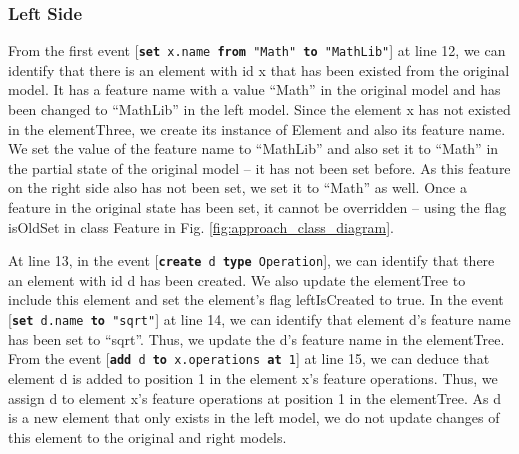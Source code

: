 \documentclass{jot}
\begin{document}
\subsubsection{Left Side}\label{sec:left_side}

From the first event [\texttt{\small \textbf{set} x.name \textbf{from} "Math" \textbf{to} "MathLib"}] at line 12, we can identify that there is an element with id \textsf{x} that has been existed from the original model. It has a feature \textsf{name} with a value ``Math'' in the original model and has been changed to ``MathLib'' in the left model. Since the element \textsf{x} has not existed in the \textsf{elementThree}, we create its instance of \textsf{Element} and also its feature \textsf{name}. We set the value of the feature \textsf{name} to ``MathLib'' and also set it to ``Math'' in the partial state of the original model -- it has not been set before. As this feature on the right side also has not been set, we set it to ``Math'' as well. Once a feature in the original state has been set, it cannot be overridden -- using the flag \textsf{isOldSet} in class \textsf{Feature} in Fig. \ref{fig:approach_class_diagram}. 

At line 13, in the event [\texttt{\small \textbf{create} d \textbf{type} Operation}], we can identify that there an element with id \textsf{d} has been created. We also update the \textsf{elementTree} to include this element and set the element's flag \textsf{leftIsCreated} to \textsf{true}. In the event [\texttt{\small \textbf{set} d.name \textbf{to} "sqrt"}] at line 14, we can identify that element \textsf{d}'s feature \textsf{name} has been set to ``sqrt''. Thus, we update the \textsf{d}'s feature \textsf{name} in the \textsf{elementTree}. From the event [\texttt{\small \textbf{add} d \textbf{to} x.operations \textbf{at} 1}] at line 15, we can deduce that element \textsf{d} is added to position 1 in the element \textsf{x}'s feature \textsf{operations}. Thus, we assign \textsf{d} to element \textsf{x}'s feature \textsf{operations} at position 1 in the \textsf{elementTree}. As \textsf{d} is a new element that only exists in the left model, we do not update changes of this element to the original and right models. 
\end{document}
